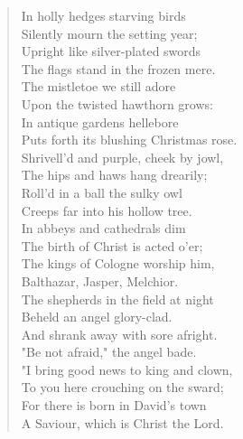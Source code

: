 
\begin{verse}
In holly hedges starving birds\\
\hspace*{2em}Silently mourn the setting year;\\
Upright like silver-plated swords\\
\hspace*{2em}The flags stand in the frozen mere.\\[0.7em]

The mistletoe we still adore\\
\hspace*{2em}Upon the twisted hawthorn grows:\\
In antique gardens hellebore\\
\hspace*{2em}Puts forth its blushing Christmas rose.\\[0.7em]

Shrivell'd and purple, cheek by jowl,\\
\hspace*{2em}The hips and haws hang drearily;\\
Roll'd in a ball the sulky owl\\
\hspace*{2em}Creeps far into his hollow tree.\\[0.7em]

In abbeys and cathedrals dim\\
\hspace*{2em}The birth of Christ is acted o'er;\\
The kings of Cologne worship him,\\
\hspace*{2em}Balthazar, Jasper, Melchior.\\[0.7em]

The shepherds in the field at night\\
\hspace*{2em}Beheld an angel glory-clad.\\
And shrank away with sore afright.\\
\hspace*{2em}"Be not afraid," the angel bade.\\[0.7em]

"I bring good news to king and clown,\\
\hspace*{2em}To you here crouching on the sward;\\
For there is born in David's town\\
\hspace*{2em}A Saviour, which is Christ the Lord.\\[0.7em]


\end{verse}
